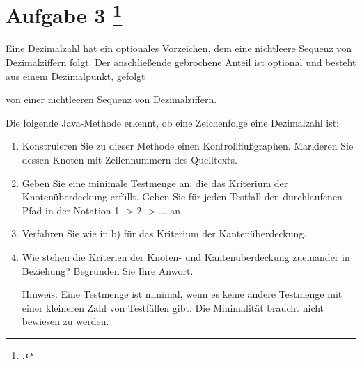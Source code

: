 \documentclass{lehramt-informatik-aufgabe}
\begin{document}
\section{Aufgabe 3
\index{}
\footcite{examen:66116:2019:09}}

Eine Dezimalzahl hat ein optionales Vorzeichen, dem eine nichtleere
Sequenz von Dezimalziffern folgt. Der anschließende gebrochene Anteil
ist optional und besteht aus einem Dezimalpunkt, gefolgt

von einer nichtleeren Sequenz von Dezimalziffern.

Die folgende Java-Methode erkennt, ob eine Zeichenfolge eine Dezimalzahl
ist:


\begin{enumerate}


\item Konstruieren Sie zu dieser Methode einen Kontrollflußgraphen.
Markieren Sie dessen Knoten mit Zeilennummern des Quelltexts.


\item Geben Sie eine minimale Testmenge an, die das Kriterium der
Knotenüberdeckung erfüllt. Geben Sie für jeden Testfall den
durchlaufenen Pfad in der Notation 1 -> 2 -> ... an.


\item Verfahren Sie wie in b) für das Kriterium der Kantenüberdeckung.


\item Wie stehen die Kriterien der Knoten- und Kantenüberdeckung
zueinander in Beziehung? Begründen Sie Ihre Anwort.

Hinweis: Eine Testmenge ist minimal, wenn es keine andere Testmenge mit
einer kleineren Zahl von Testfällen gibt. Die Minimalität braucht nicht
bewiesen zu werden.

\end{enumerate}
\end{document}
